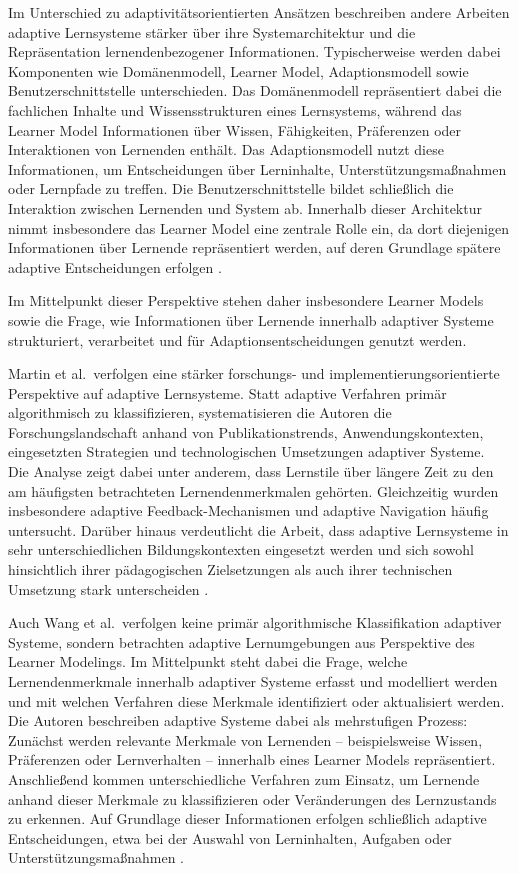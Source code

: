 Im Unterschied zu adaptivitätsorientierten Ansätzen beschreiben andere
Arbeiten adaptive Lernsysteme stärker über ihre Systemarchitektur und
die Repräsentation lernendenbezogener Informationen. Typischerweise
werden dabei Komponenten wie Domänenmodell, Learner Model,
Adaptionsmodell sowie Benutzerschnittstelle unterschieden. Das
Domänenmodell repräsentiert dabei die fachlichen Inhalte und
Wissensstrukturen eines Lernsystems, während das Learner Model
Informationen über Wissen, Fähigkeiten, Präferenzen oder Interaktionen
von Lernenden enthält. Das Adaptionsmodell nutzt diese Informationen, um
Entscheidungen über Lerninhalte, Unterstützungsmaßnahmen oder Lernpfade
zu treffen. Die Benutzerschnittstelle bildet schließlich die Interaktion
zwischen Lernenden und System ab. Innerhalb dieser Architektur nimmt
insbesondere das Learner Model eine zentrale Rolle ein, da dort
diejenigen Informationen über Lernende repräsentiert werden, auf deren
Grundlage spätere adaptive Entscheidungen erfolgen \citep{Wang2025}.

Im Mittelpunkt dieser Perspektive stehen daher insbesondere Learner
Models sowie die Frage, wie Informationen über Lernende innerhalb
adaptiver Systeme strukturiert, verarbeitet und für
Adaptionsentscheidungen genutzt werden.

Martin et al.~verfolgen eine stärker forschungs- und
implementierungsorientierte Perspektive auf adaptive Lernsysteme. Statt
adaptive Verfahren primär algorithmisch zu klassifizieren,
systematisieren die Autoren die Forschungslandschaft anhand von
Publikationstrends, Anwendungskontexten, eingesetzten Strategien und
technologischen Umsetzungen adaptiver Systeme.\\
Die Analyse zeigt dabei unter anderem, dass Lernstile über längere Zeit
zu den am häufigsten betrachteten Lernendenmerkmalen gehörten.
Gleichzeitig wurden insbesondere adaptive Feedback-Mechanismen und
adaptive Navigation häufig untersucht. Darüber hinaus verdeutlicht die
Arbeit, dass adaptive Lernsysteme in sehr unterschiedlichen
Bildungskontexten eingesetzt werden und sich sowohl hinsichtlich ihrer
pädagogischen Zielsetzungen als auch ihrer technischen Umsetzung stark
unterscheiden \citep{Martin2020}.

Auch Wang et al.~verfolgen keine primär algorithmische Klassifikation
adaptiver Systeme, sondern betrachten adaptive Lernumgebungen aus
Perspektive des Learner Modelings. Im Mittelpunkt steht dabei die Frage,
welche Lernendenmerkmale innerhalb adaptiver Systeme erfasst und
modelliert werden und mit welchen Verfahren diese Merkmale identifiziert
oder aktualisiert werden. Die Autoren beschreiben adaptive Systeme dabei
als mehrstufigen Prozess: Zunächst werden relevante Merkmale von
Lernenden -- beispielsweise Wissen, Präferenzen oder Lernverhalten --
innerhalb eines Learner Models repräsentiert. Anschließend kommen
unterschiedliche Verfahren zum Einsatz, um Lernende anhand dieser
Merkmale zu klassifizieren oder Veränderungen des Lernzustands zu
erkennen. Auf Grundlage dieser Informationen erfolgen schließlich
adaptive Entscheidungen, etwa bei der Auswahl von Lerninhalten, Aufgaben
oder Unterstützungsmaßnahmen \citep{Wang2025}.

